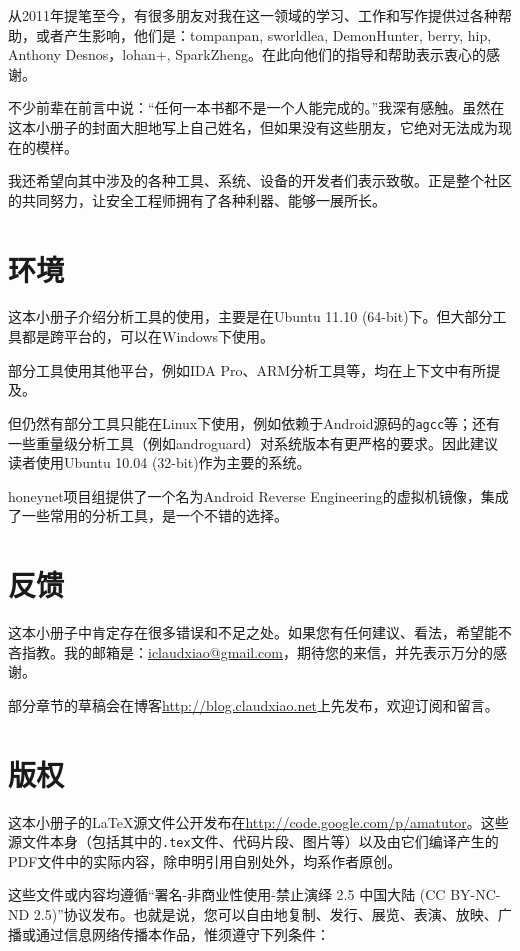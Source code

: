 从2011年提笔至今，有很多朋友对我在这一领域的学习、工作和写作提供过各种帮助，或者产生影响，他们是：tompanpan, sworldlea, DemonHunter, berry, hip, Anthony Desnos，lohan+, SparkZheng。在此向他们的指导和帮助表示衷心的感谢。

不少前辈在前言中说：“任何一本书都不是一个人能完成的。”我深有感触。虽然在这本小册子的封面大胆地写上自己姓名，但如果没有这些朋友，它绝对无法成为现在的模样。

我还希望向其中涉及的各种工具、系统、设备的开发者们表示致敬。正是整个社区的共同努力，让安全工程师拥有了各种利器、能够一展所长。

\section*{环境}
这本小册子介绍分析工具的使用，主要是在Ubuntu 11.10 (64-bit)下。但大部分工具都是跨平台的，可以在Windows下使用。

部分工具使用其他平台，例如IDA Pro、ARM分析工具等，均在上下文中有所提及。

但仍然有部分工具只能在Linux下使用，例如依赖于Android源码的\lstinline!agcc!等；还有一些重量级分析工具（例如androguard）对系统版本有更严格的要求。因此建议读者使用Ubuntu 10.04 (32-bit)作为主要的系统。

honeynet项目组提供了一个名为Android Reverse Engineering的虚拟机镜像\cite{url:are}，集成了一些常用的分析工具，是一个不错的选择。

\section*{反馈}
这本小册子中肯定存在很多错误和不足之处。如果您有任何建议、看法，希望能不吝指教。我的邮箱是：\href{mailto:iclaudxiao@gmail.com}{iclaudxiao@gmail.com}，期待您的来信，并先表示万分的感谢。

部分章节的草稿会在博客\url{http://blog.claudxiao.net}上先发布，欢迎订阅和留言。

\section*{版权}
这本小册子的{\LaTeX}源文件公开发布在\url{http://code.google.com/p/amatutor}。这些源文件本身（包括其中的\lstinline!.tex!文件、代码片段、图片等）以及由它们编译产生的PDF文件中的实际内容，除申明引用自别处外，均系作者原创。

这些文件或内容均遵循“署名-非商业性使用-禁止演绎 2.5 中国大陆 (CC BY-NC-ND 2.5)”协议发布。也就是说，您可以自由地复制、发行、展览、表演、放映、广播或通过信息网络传播本作品，惟须遵守下列条件：

